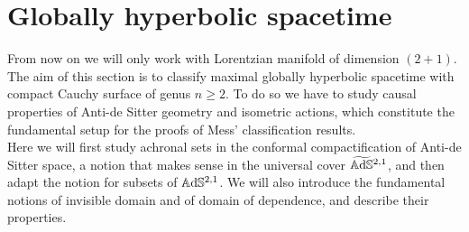 \chapter{Globally hyperbolic spacetime}\label{chapter:4}

From now on we will only work with Lorentzian manifold of dimension $(2+1)$.\\
The aim of this section is to classify maximal globally hyperbolic spacetime with compact Cauchy surface of genus $n\geq 2$. To do so we have to study causal properties of Anti-de Sitter geometry and isometric actions, which constitute the fundamental setup for the proofs of Mess' classification results.\\
Here we will first study achronal sets in the conformal compactification of Anti-de Sitter space, a notion that makes sense in the universal cover $\widetilde{\mathbb{A}\mathrm{d}\mathbb{S}}{}^{2,1}$, and then adapt the notion
for subsets of $\mathbb{A}\mathrm{d}\mathbb{S}^{2,1}$. We will also introduce the fundamental notions of invisible domain and of domain of dependence, and describe their properties.


